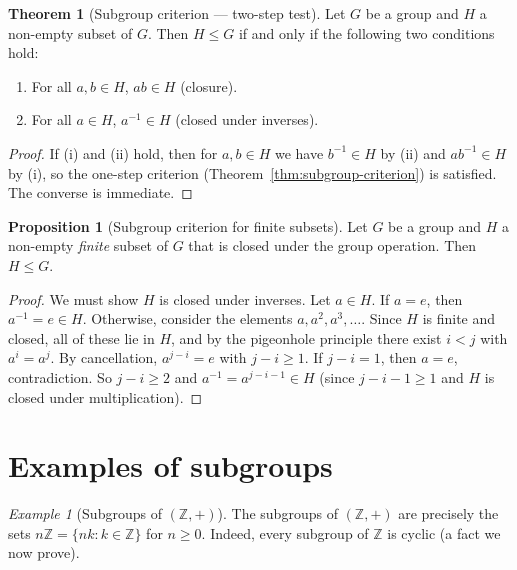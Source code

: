 \documentclass[12pt,a4paper,openany]{book}
\theoremstyle{definition}
\newtheorem{theorem}{Theorem}[chapter]
\newtheorem{proposition}{Proposition}[chapter]
\theoremstyle{remark}
\newtheorem{example}{Example}[chapter]
\newcommand{\Z}{\mathbb{Z}}
\begin{document}
\begin{theorem}[Subgroup criterion --- two-step test]
\label{thm:subgroup-criterion-two}
Let $G$ be a group and $H$ a non-empty subset of $G$.  Then $H\le G$ if and
only if the following two conditions hold:
\begin{enumerate}[label=(\roman*)]
  \item For all $a,b\in H$, $ab\in H$ (closure).
  \item For all $a\in H$, $a^{-1}\in H$ (closed under inverses).
\end{enumerate}
\end{theorem}

\begin{proof}
If (i) and (ii) hold, then for $a,b\in H$ we have $b^{-1}\in H$ by (ii)
and $ab^{-1}\in H$ by (i), so the one-step criterion
(Theorem~\ref{thm:subgroup-criterion}) is satisfied.  The converse is
immediate.
\end{proof}

\begin{proposition}[Subgroup criterion for finite subsets]
\label{prop:finite-subgroup-criterion}
Let $G$ be a group and $H$ a non-empty \emph{finite} subset of $G$ that is
closed under the group operation.  Then $H\le G$.
\end{proposition}

\begin{proof}
We must show $H$ is closed under inverses.  Let $a\in H$.  If $a=e$, then
$a^{-1}=e\in H$.  Otherwise, consider the elements $a, a^2, a^3,\ldots$.
Since $H$ is finite and closed, all of these lie in $H$, and by the
pigeonhole principle there exist $i<j$ with $a^i=a^j$.  By cancellation,
$a^{j-i}=e$ with $j-i\ge 1$.  If $j-i=1$, then $a=e$, contradiction.  So
$j-i\ge 2$ and $a^{-1}=a^{j-i-1}\in H$ (since $j-i-1\ge 1$ and $H$ is
closed under multiplication).
\end{proof}

\section{Examples of subgroups}
\label{sec:ch2-subgroup-examples}

\begin{example}[Subgroups of $(\Z,+)$]
\label{ex:subgroups-Z}
The subgroups of $(\Z,+)$ are precisely the sets $n\Z=\{nk:k\in\Z\}$ for
$n\ge 0$.  Indeed, every subgroup of $\Z$ is cyclic (a fact we now prove).
\end{example}
\end{document}
